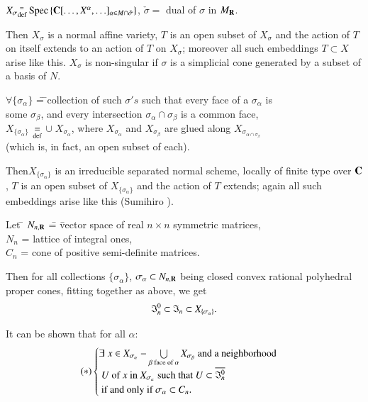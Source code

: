 \begin{description}
$X_\sigma {}^{\;=}_{\operatorname{def}} \operatorname{Spec} \left\{\mathbf{C} [\ldots, X^\alpha, \ldots]_{\alpha\in M \cap \check{\sigma}} \right\}$, $\check{\sigma} = $ dual of $\sigma$ in $M_{\mathbf{R}}$.

Then $X_\sigma$ is a normal affine variety, $T$ is an open subset of $X_\sigma$ and the action of $T$ on itself extends to an action of $T$ on $X_\sigma$; moreover all such embeddings $T \subset X$ arise like this. $X_\sigma$ is non-singular if $\sigma$ is a simplicial cone generated by a subset of a basis of $N$.
\begin{tabbing}
$\forall \{\sigma_\alpha\}$ \= = \= \;collection of such $\sigma's$ such that every face of a $\sigma_\alpha$ is\\
\> \> some $\sigma_\beta$, and every intersection $\sigma_\alpha \cap \sigma_\beta$ is a common face,\\
$X_{\{\sigma_\alpha\}}$ \> ${\displaystyle{\mathop{=}_{\operatorname{def}}}} $ \> \;$\cup \;X_{\sigma_\alpha}$, where $X_{\sigma_\alpha}$ and $X_{\sigma_\beta}$ are glued along $X_{\sigma_{\alpha \cap \sigma_\beta}}$\\
\> \> (which is, in fact, an open subset of each).
\end{tabbing}
Then\pageoriginale $X_{\{\sigma_\alpha\}}$ is an irreducible separated normal scheme, locally of finite type over $\mathbf{C}$, $T$ is an open subset of $X_{\{\sigma_\alpha\}}$ and the action of $T$ extends; again all such embeddings arise like this (Sumihiro \cite{art8-key10}).
\begin{tabbing}
Let \= $N_{n, \mathbf{R}}$ \= = \= vector space of real $n \times n$ symmetric matrices,\\
\> $N_n$ \> = \> lattice of integral ones,\\
\> $C_n$ \> = \> cone of positive semi-definite matrices.
\end{tabbing}
Then for all collections $\{\sigma_\alpha\}$, $\sigma_\alpha \subset N_{n, \mathbf{R}}$ being closed convex rational polyhedral proper cones, fitting together as above, we get
$$
\mathfrak{I}^0_n \subset \mathfrak{I}_n \subset X_{\{\sigma_\alpha\}}.
$$

It can be shown that for all $\alpha$:
$$
(\ast) 
\begin{cases}
\exists \; x \in X_{\sigma_\alpha} - \bigcup\limits_{\beta \text{ face of } \alpha} X_{\sigma_\beta}  \text{ and a neighborhood}\\
~ U \text{ of } x  \text{ in } X_{\sigma_\alpha} \text{ such that } U \subset \overline{\mathfrak{I}^0_n}\\
\text{ if and only if } \sigma_\alpha \subset C_n.
\end{cases}
$$


\end{description}
